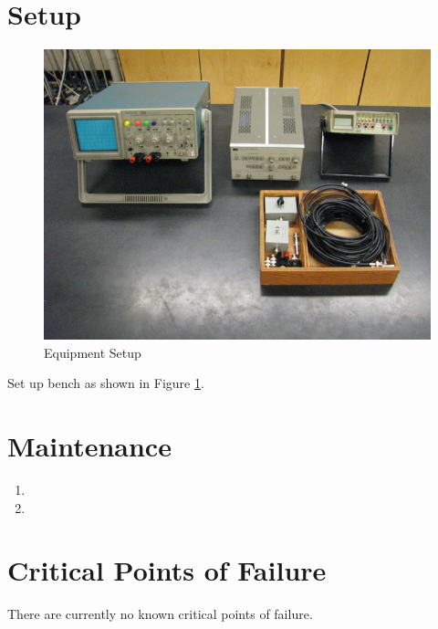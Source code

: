 \section{Setup}
\begin{figure}
\includegraphics{Travelling-Waves-Setup.jpg}
\caption{Equipment Setup}
\label{pic:TWsetup}
\end{figure}

Set up bench as shown in Figure \ref{pic:TWsetup}.

\section{Maintenance}

\begin{enumerate}
\item 
\item 
\end{enumerate}

\section{Critical Points of Failure}

There are currently no known critical points of failure.

